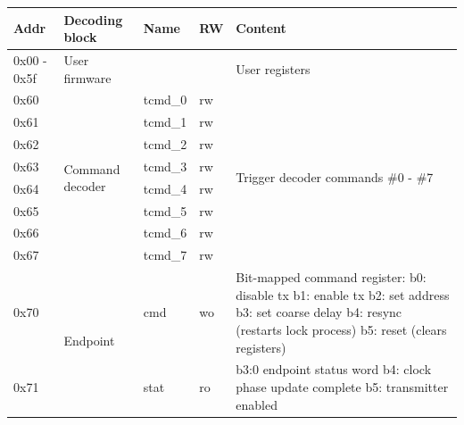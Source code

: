 \documentclass{article}
\begin{document}
\begin{table}[H]
\begin{tabularx}{\textwidth}{|
p{}|
p{}|
p{}|
p{}|
p{}|} \hline
\textbf{Addr} & \textbf{Decoding block} & \textbf{Name} & \textbf{RW} & \textbf{Content} \\\hline 
0x00 - 0x5f   & User firmware           &               &               & User registers \\\hline 
0x60          & \multirow{8}{=}{Command decoder}  & tcmd\_0 & rw & \multirow{8}{=}{Trigger decoder commands \#0 - \#7}  \\\cline{1-1}\cline{3-4}
0x61          &                         & tcmd\_1 & rw &  \\\cline{1-1}\cline{3-4}
0x62          &                         & tcmd\_2 & rw &  \\\cline{1-1}\cline{3-4}
0x63          &                         & tcmd\_3 & rw &  \\\cline{1-1}\cline{3-4}
0x64          &                         & tcmd\_4 & rw &  \\\cline{1-1}\cline{3-4}
0x65          &                         & tcmd\_5 & rw &  \\\cline{1-1}\cline{3-4}
0x66          &                         & tcmd\_6 & rw &  \\\cline{1-1}\cline{3-4}
0x67          &                         & tcmd\_7 & rw &  \\\hline 
0x70          & \multirow{6}{=}{Endpoint}  & cmd & wo & Bit-mapped command register:\newline\newline
b0: disable tx\newline
b1: enable tx\newline
b2: set address\newline
b3: set coarse delay\newline
b4: resync (restarts lock process)\newline
b5: reset (clears registers)
 \\\cline{1-1}\cline{3-5}
0x71          &        & stat & ro & b3:0 endpoint status word \newline b4: clock phase update complete \newline b5: transmitter enabled\\\cline{1-1}\cline{3-5}

\end{tabularx}
\end{table}
\end{document}
